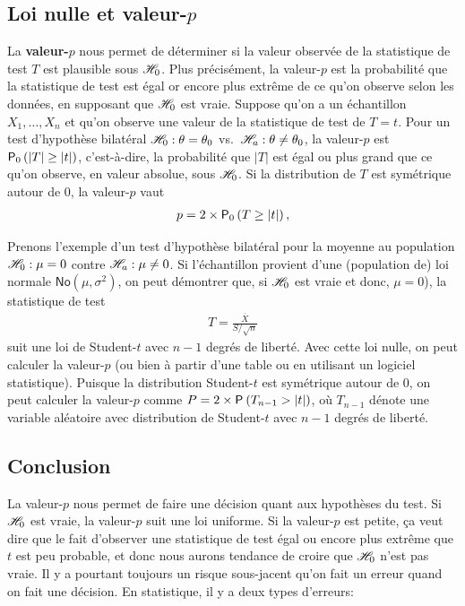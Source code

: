 \documentclass[
  11pt,
  letterpaper,
]{book}
\begin{document}
\hypertarget{loi-nulle-et-valeur-p}{%
\subsection{\texorpdfstring{Loi nulle et valeur-\(p\)}{Loi nulle et valeur-p}}\label{loi-nulle-et-valeur-p}}

La \textbf{valeur-\(p\)} nous permet de déterminer si la valeur observée de la statistique de test \(T\) est plausible sous \(\Hy_0\). Plus précisément, la valeur-\(p\) est la probabilité que la statistique de test est égal or encore plus extrême de ce qu'on observe selon les données, en supposant que \(\Hy_0\) est vraie. Suppose qu'on a un échantillon \(X_1, \ldots, X_n\) et qu'on observe une valeur de la statistique de test de \(T=t\). Pour un test d'hypothèse bilatéral \(\Hy_0:\theta=\theta_0\) vs.~\(\Hy_a:\theta \neq \theta_0\), la valeur-\(p\) est
\(\pr[0]{|T| \geq |t|}\), c'est-à-dire, la probabilité que \(|T|\) est égal ou plus grand que ce qu'on observe, en valeur absolue, sous \(\Hy_0\). Si la distribution de \(T\) est symétrique autour de \(0\), la valeur-\(p\) vaut
\begin{align*}
p = 2 \times \pr[0]{T \geq |t|}, 
\end{align*}

Prenons l'exemple d'un test d'hypothèse bilatéral pour la moyenne au population \(\Hy_0:\mu=0\) contre \(\Hy_a:\mu \neq 0\). Si l'échantillon provient d'une (population de) loi normale \(\mathsf{No}(\mu, \sigma^2)\), on peut démontrer que, si \(\Hy_0\) est vraie et donc, \(\mu=0\)), la statistique de test
\begin{align*}
T = \frac{\overline{X}}{S/\sqrt{n}}
\end{align*}
suit une loi de Student-\(t\) avec \(n-1\) degrés de liberté. Avec cette loi nulle, on peut calculer la valeur-\(p\) (ou bien à partir d'une table ou en utilisant un logiciel statistique). Puisque la distribution Student-\(t\) est symétrique autour de \(0\), on peut calculer la valeur-\(p\) comme \(P = 2\times\pr{T_{n-1} > |t|}\), où \(T_{n-1}\) dénote une variable aléatoire avec distribution de Student-\(t\) avec \(n-1\) degrés de liberté.

\hypertarget{conclusion}{%
\subsection{Conclusion}\label{conclusion}}

La valeur-\(p\) nous permet de faire une décision quant aux hypothèses du test. Si \(\Hy_0\) est vraie, la valeur-\(p\) suit une loi uniforme. Si la valeur-\(p\) est petite, ça veut dire que le fait d'observer une statistique de test égal ou encore plus extrême que \(t\) est peu probable, et donc nous aurons tendance de croire que \(\Hy_0\) n'est pas vraie. Il y a pourtant toujours un risque sous-jacent qu'on fait un erreur quand on fait une décision. En statistique, il y a deux types d'erreurs:
\end{document}
